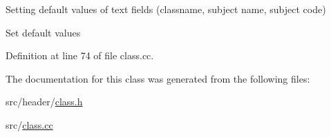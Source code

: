Setting default values of text fields (classname, subject name, subject code) 

Set default values 

Definition at line 74 of file class.\-cc.



The documentation for this class was generated from the following files\-:\begin{DoxyCompactItemize}
\item 
src/header/\hyperlink{class_8h}{class.\-h}\item 
src/\hyperlink{class_8cc}{class.\-cc}\end{DoxyCompactItemize}
